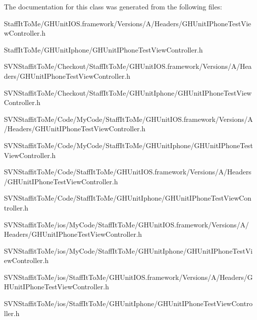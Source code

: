 \-The documentation for this class was generated from the following files\-:\begin{DoxyCompactItemize}
\item 
\-Staff\-It\-To\-Me/\-G\-H\-Unit\-I\-O\-S.\-framework/\-Versions/\-A/\-Headers/\-G\-H\-Unit\-I\-Phone\-Test\-View\-Controller.\-h\item 
\-Staff\-It\-To\-Me/\-G\-H\-Unit\-Iphone/\-G\-H\-Unit\-I\-Phone\-Test\-View\-Controller.\-h\item 
\-S\-V\-N\-Staffit\-To\-Me/\-Checkout/\-Staff\-It\-To\-Me/\-G\-H\-Unit\-I\-O\-S.\-framework/\-Versions/\-A/\-Headers/\-G\-H\-Unit\-I\-Phone\-Test\-View\-Controller.\-h\item 
\-S\-V\-N\-Staffit\-To\-Me/\-Checkout/\-Staff\-It\-To\-Me/\-G\-H\-Unit\-Iphone/\-G\-H\-Unit\-I\-Phone\-Test\-View\-Controller.\-h\item 
\-S\-V\-N\-Staffit\-To\-Me/\-Code/\-My\-Code/\-Staff\-It\-To\-Me/\-G\-H\-Unit\-I\-O\-S.\-framework/\-Versions/\-A/\-Headers/\-G\-H\-Unit\-I\-Phone\-Test\-View\-Controller.\-h\item 
\-S\-V\-N\-Staffit\-To\-Me/\-Code/\-My\-Code/\-Staff\-It\-To\-Me/\-G\-H\-Unit\-Iphone/\-G\-H\-Unit\-I\-Phone\-Test\-View\-Controller.\-h\item 
\-S\-V\-N\-Staffit\-To\-Me/\-Code/\-Staff\-It\-To\-Me/\-G\-H\-Unit\-I\-O\-S.\-framework/\-Versions/\-A/\-Headers/\-G\-H\-Unit\-I\-Phone\-Test\-View\-Controller.\-h\item 
\-S\-V\-N\-Staffit\-To\-Me/\-Code/\-Staff\-It\-To\-Me/\-G\-H\-Unit\-Iphone/\-G\-H\-Unit\-I\-Phone\-Test\-View\-Controller.\-h\item 
\-S\-V\-N\-Staffit\-To\-Me/ios/\-My\-Code/\-Staff\-It\-To\-Me/\-G\-H\-Unit\-I\-O\-S.\-framework/\-Versions/\-A/\-Headers/\-G\-H\-Unit\-I\-Phone\-Test\-View\-Controller.\-h\item 
\-S\-V\-N\-Staffit\-To\-Me/ios/\-My\-Code/\-Staff\-It\-To\-Me/\-G\-H\-Unit\-Iphone/\-G\-H\-Unit\-I\-Phone\-Test\-View\-Controller.\-h\item 
\-S\-V\-N\-Staffit\-To\-Me/ios/\-Staff\-It\-To\-Me/\-G\-H\-Unit\-I\-O\-S.\-framework/\-Versions/\-A/\-Headers/\-G\-H\-Unit\-I\-Phone\-Test\-View\-Controller.\-h\item 
\-S\-V\-N\-Staffit\-To\-Me/ios/\-Staff\-It\-To\-Me/\-G\-H\-Unit\-Iphone/\-G\-H\-Unit\-I\-Phone\-Test\-View\-Controller.\-h\end{DoxyCompactItemize}
